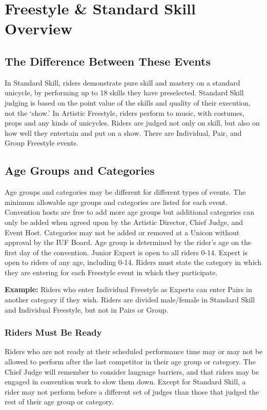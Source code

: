 \chapter{Freestyle \& Standard Skill \label{chap:freestyle} Overview}

\section{The Difference Between These Events}
In Standard Skill, riders demonstrate pure skill and mastery on a standard unicycle, by performing up to 18 skills they have preselected.
Standard Skill judging is based on the point value of the skills and quality of their execution, not the `show.'
In Artistic Freestyle, riders perform to music, with costumes, props and any kinds of unicycles.
Riders are judged not only on skill, but also on how well they entertain and put on a show.
There are Individual, Pair, and Group Freestyle events.

\section{Age Groups and Categories}
Age groups and categories may be different for different types of events.
The minimum allowable age groups and categories are listed for each event.
Convention hosts are free to add more age groups but additional categories can only be added when agreed upon by the Artistic Director, Chief Judge, and Event Host.
Categories may not be added or removed at a Unicon without approval by the IUF Board.
Age group is determined by the rider's age on the first day of the convention.
Junior Expert is open to all riders 0-14.
Expert is open to riders of any age, including 0-14.
Riders must state the category in which they are entering for each Freestyle event in which they participate.

\textbf{Example:} Riders who enter Individual Freestyle as Experts can enter Pairs in another category if they wish.
Riders are divided male/female in Standard Skill and Individual Freestyle, but not in Pairs or Group.

\subsection{Riders Must Be Ready}
Riders who are not ready at their scheduled performance time may or may not be allowed to perform after the last competitor in their age group or category.
The Chief Judge will remember to consider language barriers, and that riders may be engaged in convention work to slow them down.
Except for Standard Skill, a rider may not perform before a different set of judges than those that judged the rest of their age group or category.

